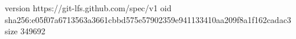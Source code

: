 version https://git-lfs.github.com/spec/v1
oid sha256:e05f07a6713563a3661cbbd575e57902359e941133410aa209f8a1f162cadac3
size 349692
